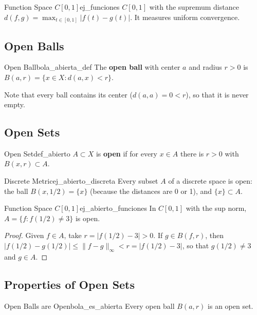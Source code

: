\documentclass[11pt, a4paper]{article}
\begin{document}
\begin{ejemplo}{Function Space $C[0,1]$}{ej_funciones}
$C[0,1]$ with the supremum distance $d(f,g) = \max_{t \in [0,1]} |f(t) - g(t)|$. It measures
uniform convergence.
\end{ejemplo}

\subsection{Open Balls}

\begin{definicion}{Open Ball}{bola_abierta_def}
The \textbf{open ball} with center $a$ and radius $r > 0$ is $B(a, r) = \{x \in X : d(a, x) < r\}$.
\end{definicion}

Note that every ball contains its center ($d(a,a) = 0 < r$), so that it is never empty.

\subsection{Open Sets}

\begin{definicion}{Open Set}{def_abierto}
$A \subset X$ is \textbf{open} if for every $x \in A$ there is $r > 0$ with $B(x, r) \subset A$.
\end{definicion}

\begin{ejemplo}{Discrete Metric}{ej_abierto_discreta}
Every subset $A$ of a discrete space is open: the ball $B(x, 1/2) = \{x\}$ (because the
distances are 0 or 1), and $\{x\} \subset A$.
\end{ejemplo}

\begin{ejemplo}{Function Space $C[0,1]$}{ej_abierto_funciones}
In $C[0,1]$ with the sup norm, $A = \{f : f(1/2) \ne 3\}$ is open.

\begin{proof}
Given $f \in A$, take $r = |f(1/2) - 3| > 0$. If $g \in B(f, r)$, then
$|f(1/2) - g(1/2)| \le \|f - g\|_\infty < r = |f(1/2) - 3|$, so that $g(1/2) \ne 3$ and $g \in A$.
\end{proof}
\end{ejemplo}

\subsection{Properties of Open Sets}

\begin{proposicion}{Open Balls are Open}{bola_es_abierta}
Every open ball $B(a, r)$ is an open set.
\end{proposicion}
\end{document}
